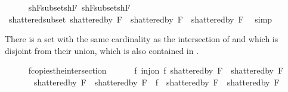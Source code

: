 \begin{isabellebody}
\isanewline
\ \ \ \ \isamarkupfalse%
\ shF{}{\isacharunderscore}{\kern0pt}subset{\isacharunderscore}{\kern0pt}shF\ shF{}{\isacharunderscore}{\kern0pt}subset{\isacharunderscore}{\kern0pt}shF\ \isamarkupfalse%
\ shattered{\isacharunderscore}{\kern0pt}subset{\isacharcolon}{\kern0pt}\ {\isachardoublequoteopen}{\isacharparenleft}{\kern0pt}shattered{\isacharunderscore}{\kern0pt}by\ {\isacharquery}{\kern0pt}F{}{\isacharparenright}{\kern0pt}\ {\isasymunion}\ {\isacharparenleft}{\kern0pt}shattered{\isacharunderscore}{\kern0pt}by\ {\isacharquery}{\kern0pt}F{}{\isacharparenright}{\kern0pt}\ {\isasymsubseteq}\ shattered{\isacharunderscore}{\kern0pt}by\ F{\isachardoublequoteclose}\ \isamarkupfalse%
\ simp%
\begin{isamarkuptext}%
There is a set with the same cardinality as the intersection of 
         and  which is disjoint from their union, 
        which is also contained in .%
\end{isamarkuptext}\isamarkuptrue%
\ \ \ \ \isamarkupfalse%
\ f{\isacharunderscore}{\kern0pt}copies{\isacharunderscore}{\kern0pt}the{\isacharunderscore}{\kern0pt}intersection{\isacharcolon}{\kern0pt}\isanewline
\ \ \ \ \ \ {\isachardoublequoteopen}{\isasymexists}f{\isachardot}{\kern0pt}\ inj{\isacharunderscore}{\kern0pt}on\ f\ {\isacharparenleft}{\kern0pt}shattered{\isacharunderscore}{\kern0pt}by\ {\isacharquery}{\kern0pt}F{}\ {\isasyminter}\ shattered{\isacharunderscore}{\kern0pt}by\ {\isacharquery}{\kern0pt}F{}{\isacharparenright}{\kern0pt}\ {\isasymand}\isanewline
\ \ \ \ \ \ \ {\isacharparenleft}{\kern0pt}shattered{\isacharunderscore}{\kern0pt}by\ {\isacharquery}{\kern0pt}F{}\ {\isasymunion}\ shattered{\isacharunderscore}{\kern0pt}by\ {\isacharquery}{\kern0pt}F{}{\isacharparenright}{\kern0pt}\ {\isasyminter}\ {\isacharparenleft}{\kern0pt}f\ {\isacharbackquote}{\kern0pt}\ {\isacharparenleft}{\kern0pt}shattered{\isacharunderscore}{\kern0pt}by\ {\isacharquery}{\kern0pt}F{}\ {\isasyminter}\ shattered{\isacharunderscore}{\kern0pt}by\ {\isacharquery}{\kern0pt}F{}{\isacharparenright}{\kern0pt}{\isacharparenright}{\kern0pt}\ {\isacharequal}{\kern0pt}\ {\isacharbraceleft}{\kern0pt}{\isacharbraceright}{\kern0pt}\ {\isasymand}\isanewline

\end{isabellebody}
